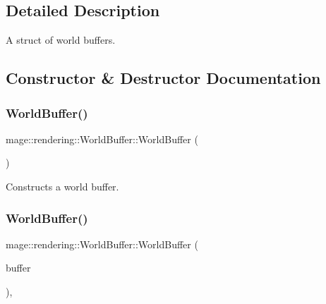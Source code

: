\subsection{Detailed Description}
A struct of world buffers. 

\subsection{Constructor \& Destructor Documentation}
\hypertarget{structmage_1_1rendering_1_1_world_buffer_a7f51349a6ffa759e245230fa26eaf318}{}\label{structmage_1_1rendering_1_1_world_buffer_a7f51349a6ffa759e245230fa26eaf318} 
\subsubsection{\texorpdfstring{World\+Buffer()}{WorldBuffer()}\hspace{0.1cm}{\footnotesize\ttfamily [1/3]}}
{\footnotesize\ttfamily mage\+::rendering\+::\+World\+Buffer\+::\+World\+Buffer (\begin{DoxyParamCaption}{ }\end{DoxyParamCaption})\hspace{0.3cm}{\ttfamily [noexcept]}}

Constructs a world buffer. \hypertarget{structmage_1_1rendering_1_1_world_buffer_a70a1f1b062c0548f2ff87db8d78749f2}{}\label{structmage_1_1rendering_1_1_world_buffer_a70a1f1b062c0548f2ff87db8d78749f2} 
\subsubsection{\texorpdfstring{World\+Buffer()}{WorldBuffer()}\hspace{0.1cm}{\footnotesize\ttfamily [2/3]}}
{\footnotesize\ttfamily mage\+::rendering\+::\+World\+Buffer\+::\+World\+Buffer (\begin{DoxyParamCaption}\item[{const \hyperlink{structmage_1_1rendering_1_1_world_buffer}{World\+Buffer} \&}]{buffer }\end{DoxyParamCaption})\hspace{0.3cm}{\ttfamily [default]}, {\ttfamily [noexcept]}}

